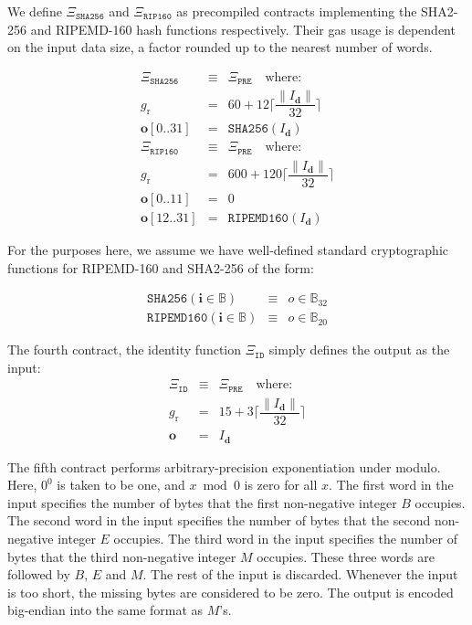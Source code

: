 \documentclass[9pt,oneside]{amsart}
\begin{document}
We define $\Xi_{\mathtt{SHA256}}$ and $\Xi_{\mathtt{RIP160}}$ as precompiled contracts implementing the SHA2-256 and RIPEMD-160 hash functions respectively. Their gas usage is dependent on the input data size, a factor rounded up to the nearest number of words.

\begin{eqnarray}
\Xi_{\mathtt{SHA256}} &\equiv& \Xi_{\mathtt{PRE}} \quad \text{where:} \\
g_{\mathrm{r}} &=& 60 + 12\Big\lceil \dfrac{\lVert I_{\mathbf{d}} \rVert}{32} \Big\rceil\\
\mathbf{o}[0..31] &=& \mathtt{SHA256}(I_{\mathbf{d}})\\
\Xi_{\mathtt{RIP160}} &\equiv& \Xi_{\mathtt{PRE}} \quad \text{where:} \\
g_{\mathrm{r}} &=& 600 + 120\Big\lceil \dfrac{\lVert I_{\mathbf{d}} \rVert}{32} \Big\rceil\\
\mathbf{o}[0..11] &=& 0 \\
\mathbf{o}[12..31] &=& \mathtt{RIPEMD160}(I_{\mathbf{d}})
\end{eqnarray}

For the purposes here, we assume we have well-defined standard cryptographic functions for RIPEMD-160 and SHA2-256 of the form:

\begin{eqnarray}
\mathtt{SHA256}(\mathbf{i} \in \mathbb{B}) & \equiv & o \in \mathbb{B}_{32} \\
\mathtt{RIPEMD160}(\mathbf{i} \in \mathbb{B}) & \equiv & o \in \mathbb{B}_{20}
\end{eqnarray}

The fourth contract, the identity function $\Xi_{\mathtt{ID}}$ simply defines the output as the input:
\begin{eqnarray}
\Xi_{\mathtt{ID}} &\equiv& \Xi_{\mathtt{PRE}} \quad \text{where:} \\
g_{\mathrm{r}} &=& 15 + 3\Big\lceil \dfrac{\lVert I_{\mathbf{d}} \rVert}{32} \Big\rceil\\
\mathbf{o} &=& I_{\mathbf{d}}
\end{eqnarray}

The fifth contract performs arbitrary-precision exponentiation under modulo. Here, $0 ^ 0$ is taken to be one, and $x \bmod 0$ is zero for all $x$. The first word in the input specifies the number of bytes that the first non-negative integer $B$ occupies. The second word in the input specifies the number of bytes that the second non-negative integer $E$ occupies. The third word in the input specifies the number of bytes that the third non-negative integer $M$ occupies. These three words are followed by $B$, $E$ and $M$. The rest of the input is discarded. Whenever the input is too short, the missing bytes are considered to be zero. The output is encoded big-endian into the same format as $M$'s.
\end{document}
